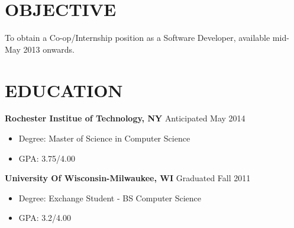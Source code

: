\documentclass{res}
\begin{document}
 

\thispagestyle{empty} %
\address{268 East Squire Drive, \\ Rochester NY 14623  }
\address{ phone: (585) 743-0764 \\   email: rsj7209@g.rit.edu} 






\begin{resume}

\section{OBJECTIVE}
\vspace{0.1in} 
To obtain a Co-op/Internship position as a Software Developer, available mid-May 2013 onwards.

\section{EDUCATION}

\vspace{0.1in} 
 {\bf Rochester Institue of Technology, NY \hfill} Anticipated May 2014
       \begin{itemize}
\setlength{\itemsep}{0pt}
	
        \item[] Degree: Master of Science in Computer Science
          \item[] GPA:  3.75/4.00

\end {itemize}

 {\bf University Of Wisconsin-Milwaukee, WI \hfill} Graduated Fall 2011
       \begin{itemize}	
\setlength{\itemsep}{0pt}
        \item[] Degree: Exchange Student - BS Computer Science
        \item[] GPA: 3.2/4.00
\end {itemize}


\end{resume}
\end{document}
